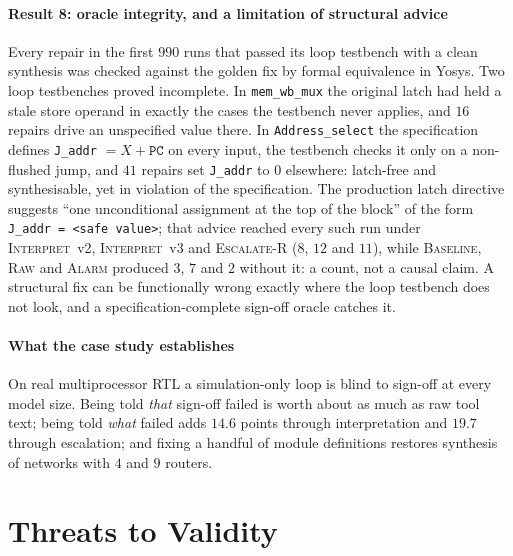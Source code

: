 \documentclass[11pt]{article}
\newcommand{\cname}[1]{\textsc{#1}}
\newcommand{\Base}{\cname{Baseline}}
\newcommand{\Alarm}{\cname{Alarm}}
\newcommand{\Raw}{\cname{Raw}}
\newcommand{\Interp}{\cname{Interpret}}
\newcommand{\EscR}{\cname{Escalate-R}}
\newcommand{\Itwo}{\Interp~v2}
\newcommand{\Ithree}{\Interp~v3}
\begin{document}
\paragraph{Result 8: oracle integrity, and a limitation of structural advice}
Every repair in the first $990$ runs that passed its loop testbench with a clean
synthesis was checked against the golden fix by formal equivalence in Yosys.
Two loop testbenches proved incomplete. In \texttt{mem\_wb\_mux} the original
latch had held a stale store operand in exactly the cases the testbench never
applies, and $16$ repairs drive an unspecified value there. In
\texttt{Address\_select} the specification defines \texttt{J\_addr} $= X +
\texttt{PC}$ on every input, the testbench checks it only on a non-flushed jump,
and $41$ repairs set \texttt{J\_addr} to $0$ elsewhere: latch-free and
synthesisable, yet in violation of the specification. The production latch
directive suggests ``one unconditional assignment at the top of the block'' of
the form \texttt{J\_addr = <safe value>}; that advice reached every such run
under \Itwo, \Ithree{} and \EscR{} ($8$, $12$ and $11$), while \Base, \Raw{} and
\Alarm{} produced $3$, $7$ and $2$ without it: a count, not a causal claim. A
structural fix can be functionally wrong exactly where the loop testbench does
not look, and a specification-complete sign-off oracle catches it.

\paragraph{What the case study establishes} On real multiprocessor RTL a
simulation-only loop is blind to sign-off at every model size. Being told
\emph{that} sign-off failed is worth about as much as raw tool text; being told
\emph{what} failed adds $14.6$ points through interpretation and $19.7$ through
escalation; and fixing a handful of module definitions restores synthesis of
networks with $4$ and $9$ routers.

\section{Threats to Validity}
\label{sec:threats}
\end{document}
